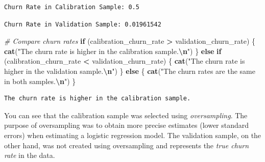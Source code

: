 \documentclass[
]{article}
\newenvironment{Shaded}{\begin{snugshade}}{\end{snugshade}}
\newcommand{\CommentTok}[1]{\textcolor[rgb]{0.56,0.35,0.01}{\textit{#1}}}
\newcommand{\ControlFlowTok}[1]{\textcolor[rgb]{0.13,0.29,0.53}{\textbf{#1}}}
\newcommand{\FunctionTok}[1]{\textcolor[rgb]{0.13,0.29,0.53}{\textbf{#1}}}
\newcommand{\NormalTok}[1]{#1}
\newcommand{\OtherTok}[1]{\textcolor[rgb]{0.56,0.35,0.01}{#1}}
\newcommand{\SpecialCharTok}[1]{\textcolor[rgb]{0.81,0.36,0.00}{\textbf{#1}}}
\newcommand{\StringTok}[1]{\textcolor[rgb]{0.31,0.60,0.02}{#1}}
\begin{document}
\begin{verbatim}
Churn Rate in Calibration Sample: 0.5 
\end{verbatim}

\begin{Shaded}
\end{Shaded}

\begin{verbatim}
Churn Rate in Validation Sample: 0.01961542 
\end{verbatim}

\begin{Shaded}
\begin{Highlighting}[]
\CommentTok{\# Compare churn rates}
\ControlFlowTok{if}\NormalTok{ (calibration\_churn\_rate }\SpecialCharTok{\textgreater{}}\NormalTok{ validation\_churn\_rate) \{}
  \FunctionTok{cat}\NormalTok{(}\StringTok{"The churn rate is higher in the calibration sample.}\SpecialCharTok{\textbackslash{}n}\StringTok{"}\NormalTok{)}
\NormalTok{\} }\ControlFlowTok{else} \ControlFlowTok{if}\NormalTok{ (calibration\_churn\_rate }\SpecialCharTok{\textless{}}\NormalTok{ validation\_churn\_rate) \{}
  \FunctionTok{cat}\NormalTok{(}\StringTok{"The churn rate is higher in the validation sample.}\SpecialCharTok{\textbackslash{}n}\StringTok{"}\NormalTok{)}
\NormalTok{\} }\ControlFlowTok{else}\NormalTok{ \{}
  \FunctionTok{cat}\NormalTok{(}\StringTok{"The churn rates are the same in both samples.}\SpecialCharTok{\textbackslash{}n}\StringTok{"}\NormalTok{)}
\NormalTok{\}}
\end{Highlighting}
\end{Shaded}

\begin{verbatim}
The churn rate is higher in the calibration sample.
\end{verbatim}

You can see that the calibration sample was selected using
\emph{oversampling}. The purpose of oversampling was to obtain more
precise estimates (lower standard errors) when estimating a logistic
regression model. The validation sample, on the other hand, was not
created using oversampling and represents the \emph{true churn rate} in
the data.
\end{document}
